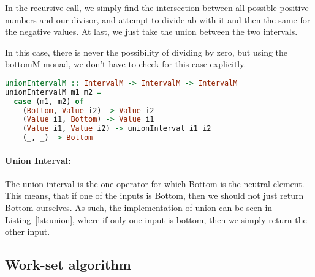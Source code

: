In the recursive call, we simply find the intersection between all possible
positive numbers and our divisor, and attempt to divide ab with it and then the
same for the negative values. At last, we just take the union between the two
intervals.

In this case, there is never the possibility of dividing by zero, but using the
bottomM monad, we don't have to check for this case explicitly.


\begin{lstlisting}[language={haskell}, caption={Union interval implementation}, label={lst:union}]
unionIntervalM :: IntervalM -> IntervalM -> IntervalM
unionIntervalM m1 m2 =
  case (m1, m2) of
    (Bottom, Value i2) -> Value i2
    (Value i1, Bottom) -> Value i1
    (Value i1, Value i2) -> unionInterval i1 i2
    (_, _) -> Bottom
\end{lstlisting}
\paragraph{Union Interval:} The union interval is the one operator for which Bottom is the neutral element.
This means, that if one of the inputs is Bottom, then we should not just return
Bottom ourselves. As such, the implementation of union can be seen in
Listing~\ref{lst:union}, where if only one input is bottom, then we simply
return the other input.



\subsection{Work-set algorithm}\label{sec:workset}
